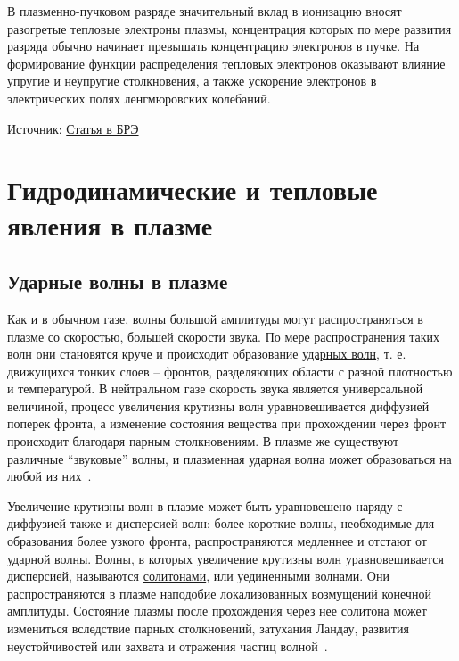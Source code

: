 \documentclass[10pt, a4paper]{article}
\let\stdsection\section
\renewcommand\section{\newpage\stdsection}
\begin{document}
В плазменно-пучковом разряде значительный вклад в ионизацию вносят разогретые тепловые электроны плазмы, концентрация которых по мере развития разряда обычно начинает превышать концентрацию электронов в пучке. На формирование функции распределения тепловых электронов оказывают влияние упругие и неупругие столкновения, а также ускорение электронов в электрических полях ленгмюровских колебаний.

Источник: \href{https://bigenc.ru/physics/text/3142852}{Статья в БРЭ}

\section{Гидродинамические и тепловые явления в плазме}

\subsection{Ударные волны в плазме}

Как и в обычном газе, волны большой амплитуды могут распространяться в плазме со скоростью, большей скорости звука. По мере распространения таких волн они становятся круче и происходит образование \uline{ударных волн}, т. е. движущихся тонких слоев -- фронтов, разделяющих области с разной плотностью и температурой. В нейтральном газе скорость звука является универсальной величиной, процесс увеличения крутизны волн уравновешивается диффузией поперек фронта, а изменение состояния вещества при прохождении через фронт происходит благодаря парным столкновениям. В плазме же существуют различные ``звуковые'' волны, и плазменная ударная волна может образоваться на любой из них~\cite{kroll}.

Увеличение крутизны волн в плазме может быть уравновешено наряду с диффузией также и дисперсией волн: более короткие волны, необходимые для образования более узкого фронта, распространяются медленнее и отстают от ударной волны. Волны, в которых увеличение крутизны волн уравновешивается дисперсией, называются \uline{солитонами}, или уединенными волнами. Они распространяются в плазме наподобие локализованных возмущений конечной амплитуды. Состояние плазмы после прохождения через нее солитона может измениться вследствие парных столкновений, затухания Ландау, развития неустойчивостей или захвата и отражения частиц волной~\cite{kroll}.
\end{document}
